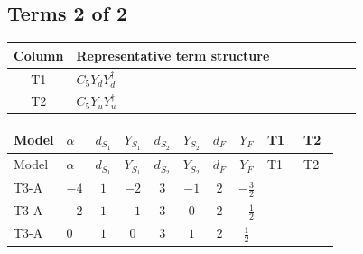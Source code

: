\documentclass[8pt]{article}
\begin{document}
\begin{landscape}
\subsection*{Terms 2 of 2}
\begin{center}
\begin{tabular}{@{}c >{\raggedright\arraybackslash}p{0.82\linewidth}@{}}
\toprule
Column & Representative term structure \\
\midrule
T1 & \(\displaystyle C_{5} Y_d Y_d^\dagger\) \\
\midrule
T2 & \(\displaystyle C_{5} Y_u Y_u^\dagger\) \\
\midrule
\bottomrule
\end{tabular}
\end{center}
\smallskip
\tiny
\begin{longtable}{@{}llcccccc >{\raggedright\arraybackslash}p{0.21\linewidth} >{\raggedright\arraybackslash}p{0.21\linewidth}@{}}
\toprule
Model & $\alpha$ & $d_{S_1}$ & $Y_{S_1}$ & $d_{S_2}$ & $Y_{S_2}$ & $d_F$ & $Y_F$ & T1 & T2 \\
\midrule
\endfirsthead
\toprule
Model & $\alpha$ & $d_{S_1}$ & $Y_{S_1}$ & $d_{S_2}$ & $Y_{S_2}$ & $d_F$ & $Y_F$ & T1 & T2 \\
\midrule
\endhead
T3-A & $-4$ & $1$ & $-2$ & $3$ & $-1$ & $2$ & $-\frac{3}{2}$ & \scriptsize\adjustbox{max width=\linewidth}{$\begin{gathered} 6 C_{5} Y_d Y_d^\dagger\end{gathered}$} & \scriptsize\adjustbox{max width=\linewidth}{$\begin{gathered} 6 C_{5} Y_u Y_u^\dagger\end{gathered}$} \\
\midrule
T3-A & $-2$ & $1$ & $-1$ & $3$ & $0$ & $2$ & $-\frac{1}{2}$ & \scriptsize\adjustbox{max width=\linewidth}{$\begin{gathered} 6 C_{5} Y_d Y_d^\dagger\end{gathered}$} & \scriptsize\adjustbox{max width=\linewidth}{$\begin{gathered} 6 C_{5} Y_u Y_u^\dagger\end{gathered}$} \\
\midrule
T3-A & $0$ & $1$ & $0$ & $3$ & $1$ & $2$ & $\frac{1}{2}$ & \scriptsize\adjustbox{max width=\linewidth}{$\begin{gathered} 6 C_{5} Y_d Y_d^\dagger\end{gathered}$} & \scriptsize\adjustbox{max width=\linewidth}{$\begin{gathered} 6 C_{5} Y_u Y_u^\dagger\end{gathered}$} \\

\end{longtable}
\end{landscape}
\end{document}
